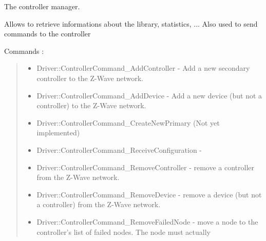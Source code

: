 \documentclass[letterpaper,10pt,english]{sphinxmanual}
\begin{document}
\begin{fulllineitems}
\label{controller:openzwave.controller.ZWaveController}
The controller manager.

Allows to retrieve informations about the library, statistics, ...
Also used to send commands to the controller

Commands :
\begin{quote}
\begin{itemize}
\item {} 
Driver::ControllerCommand\_AddController - Add a new secondary controller to the Z-Wave network.

\item {} 
Driver::ControllerCommand\_AddDevice - Add a new device (but not a controller) to the Z-Wave network.

\item {} 
Driver::ControllerCommand\_CreateNewPrimary (Not yet implemented)

\item {} 
Driver::ControllerCommand\_ReceiveConfiguration -

\item {} 
Driver::ControllerCommand\_RemoveController - remove a controller from the Z-Wave network.

\item {} 
Driver::ControllerCommand\_RemoveDevice - remove a device (but not a controller) from the Z-Wave network.

\item {} 
Driver::ControllerCommand\_RemoveFailedNode - move a node to the controller's list of failed nodes.  The node must actually

\end{itemize}


\end{quote}
\end{fulllineitems}
\end{document}
